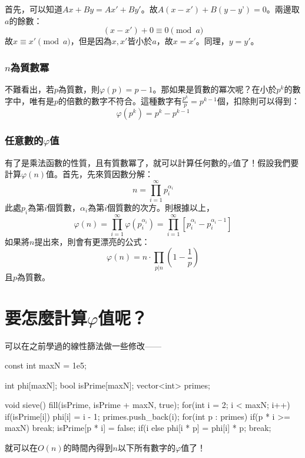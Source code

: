		首先，可以知道$Ax + By = Ax' + By'$。故$A(x - x') + B(y- y’) = 0$。兩邊取$a$的餘數：
		\begin{equation*}
			(x - x') + 0 \equiv 0 \pmod a
		\end{equation*}
		故$x \equiv x' \pmod a$，但是因為$x, x'$皆小於$a$，故$x = x'$。同理，$y = y'$。
	\subsubsection{$n$為質數冪}
		不難看出，若$p$為質數，則$\varphi(p) = p - 1$。那如果是質數的冪次呢？在小於$p^k$的數字中，唯有是$p$的倍數的數字不符合。這種數字有$\frac{p^k}{p} = p^{k - 1}$個，扣除則可以得到：
		\begin{equation*}
			\varphi(p^k) = p^k - p^{k - 1}
		\end{equation*}
	\subsubsection{任意數的$\varphi$值}
		有了是乘法函數的性質，且有質數冪了，就可以計算任何數的$\varphi$值了！假設我們要計算$\varphi(n)$值。首先，先來質因數分解：
		\begin{equation*}
			n = \prod_{i = 1}^{\infty} p_i^{\alpha_i}
		\end{equation*}
		此處$p_i$為第$i$個質數，$\alpha_i$為第$i$個質數的次方。則根據以上，
		\begin{equation*}
		\varphi(n) = \prod_{i = 1}^{\infty} \varphi(p_i^{\alpha_i}) = \prod_{i = 1}^{\infty} \left[p_i^{\alpha_i} - p_i^{\alpha_i - 1}\right]
		\end{equation*}
		如果將$n$提出來，則會有更漂亮的公式：
		\begin{equation*}
			\varphi(n) = n \cdot \prod_{p | n} (1 - \frac{1}{p})
		\end{equation*}
		且$p$為質數。

\section{要怎麼計算$\varphi$值呢？}
	可以在之前學過的線性篩法做一些修改——
\begin{C++}
const int maxN = 1e5;

int phi[maxN];
bool isPrime[maxN];
vector<int> primes;

void sieve(){
	fill(isPrime, isPrime + maxN, true);
	for(int i = 2; i < maxN; i++){
		if(isPrime[i]){
			phi[i] = i - 1;
			primes.push_back(i);
		}
		for(int p : primes){
			if(p * i >= maxN) break;
			isPrime[p * i] = false;
			if(i %
			else {
				phi[i * p] = phi[i] * p;
				break;
			}
		}
	}
}
\end{C++}
就可以在$O(n)$的時間內得到$n$以下所有數字的$\varphi$值了！	
